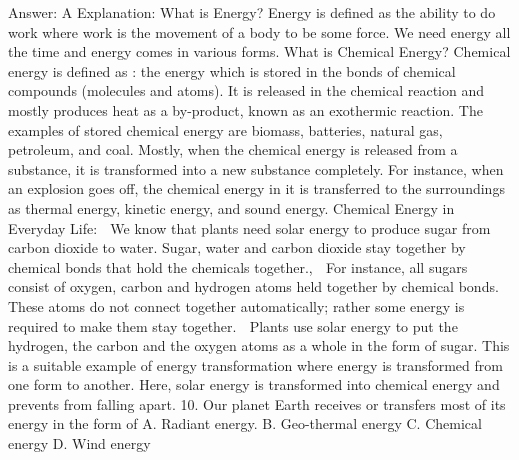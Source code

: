 Answer: A
Explanation: What is Energy? Energy is defined as the ability to do work where work is the movement of a body to be some force. We need energy all the time and energy comes in various forms. What is Chemical Energy? Chemical energy is defined as : the energy which is stored in the bonds of chemical compounds (molecules and atoms). It is released in the chemical reaction and mostly produces heat as a by-product, known as an exothermic reaction. The examples of stored chemical energy are biomass, batteries, natural gas, petroleum, and coal. Mostly, when the chemical energy is released from a substance, it is transformed into a new substance completely. For instance, when an explosion goes off, the chemical energy in it is transferred to the surroundings as thermal energy, kinetic energy, and sound energy. Chemical Energy in Everyday Life:  We know that plants need solar energy to produce sugar from carbon dioxide to water. Sugar, water and carbon dioxide stay together by chemical bonds that hold the chemicals together.,   For instance, all sugars consist of oxygen, carbon and hydrogen atoms held together by chemical bonds. These atoms do not connect together automatically; rather some energy is required to make them stay together.  Plants use solar energy to put the hydrogen, the carbon and the oxygen atoms as a whole in the form of sugar. This is a suitable example of energy transformation where energy is transformed from one form to another. Here, solar energy is transformed into chemical energy and prevents from falling apart. 10. Our planet Earth receives or transfers most of its energy in the form of A. Radiant energy. B. Geo-thermal energy C. Chemical energy D. Wind energy 

